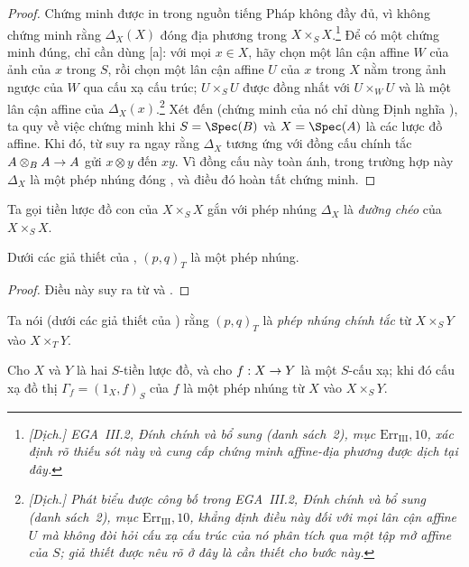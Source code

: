 \documentclass[oneside]{amsart}
\makeatletter
\newcommand{\ega@arrow}[2]{\mathchoice{#1}{#2}{#2}{#2}}
\renewcommand{\to}{\ega@arrow{\longrightarrow}{\rightarrow}}
\let\EGAOriginalLabel\label
\renewcommand{\label}[1]{\phantomsection\EGAOriginalLabel{#1}}
\makeatother
\begin{document}
\begin{proof}
Chứng minh được in trong nguồn tiếng Pháp không đầy đủ, vì không chứng minh rằng $\Delta_X(X)$ đóng địa phương trong $X\times_S X$.\footnote{\emph{[Dịch.] EGA~III.2, Đính chính và bổ sung (danh sách~2), mục $\mathrm{Err}_{\mathrm{III}},10$, xác định rõ thiếu sót này và cung cấp chứng minh affine-địa phương được dịch tại đây.}}
Để có một chứng minh đúng, chỉ cần dùng [a]:
với mọi $x\in X$, hãy chọn một lân cận affine $W$ của ảnh của $x$ trong $S$, rồi chọn một lân cận affine $U$ của $x$ trong $X$ nằm trong ảnh ngược của $W$ qua cấu xạ cấu trúc;
$U\times_S U$ được đồng nhất với $U\times_W U$ và là một lân cận affine của $\Delta_X(x)$.\footnote{\emph{[Dịch.] Phát biểu được công bố trong EGA~III.2, Đính chính và bổ sung (danh sách~2), mục $\mathrm{Err}_{\mathrm{III}},10$, khẳng định điều này đối với mọi lân cận affine $U$ mà không đòi hỏi cấu xạ cấu trúc của nó phân tích qua một tập mở affine của $S$; giả thiết được nêu rõ ở đây là cần thiết cho bước này.}}
Xét đến  (chứng minh của nó chỉ dùng Định nghĩa
), ta quy về việc chứng minh  khi
$S=\Spec(B)$ và $X=\Spec(A)$ là các lược đồ affine.
Khi đó, từ  suy ra ngay rằng $\Delta_X$ tương ứng với
đồng cấu chính tắc $A\otimes_B A\to A$ gửi $x\otimes y$ đến $xy$.
Vì đồng cấu này toàn ánh, trong trường hợp này $\Delta_X$ là một phép nhúng
đóng , và điều đó hoàn tất chứng minh.
\end{proof}

Ta gọi tiền lược đồ con của $X\times_S X$ gắn với phép nhúng $\Delta_X$  là \emph{đường chéo} của $X\times_S X$.

\begin{corollary}[5.3.10]
\label{I.5.3.10}
Dưới các giả thiết của , $(p,q)_T$ là một phép nhúng.
\end{corollary}

\begin{proof}
Điều này suy ra từ  và .
\end{proof}

Ta nói (dưới các giả thiết của ) rằng $(p,q)_T$ là \emph{phép nhúng chính tắc} từ $X\times_S Y$ vào $X\times_T Y$.

\begin{corollary}[5.3.11]
\label{I.5.3.11}
Cho $X$ và $Y$ là hai $S$-tiền lược đồ, và cho $f:X\to Y$ là một $S$-cấu xạ;
khi đó cấu xạ đồ thị $\Gamma_f=(1_X,f)_S$ của $f$  là một phép nhúng từ $X$ vào $X\times_S Y$.
\end{corollary}
\end{document}
